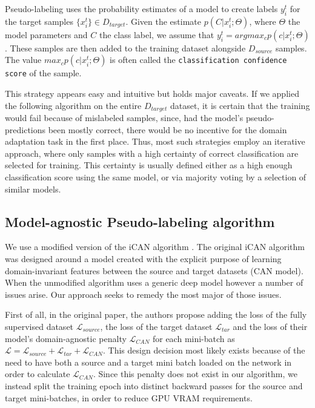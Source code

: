 \documentclass{article}
\newcommand{\loss}{\mathcal{L}}
\begin{document}
	Pseudo-labeling uses the probability estimates of a model to create labels $y_i^t$ for the target samples $\{x_i^t\} \in D_{target}$. Given the estimate $p(C | x_i^t; \Theta)$, where $\Theta$ the model parameters and $C$ the class label, we assume that $y_i^t = argmax_c{p(c | x_i^t; \Theta)}$. These samples are then added to the training dataset alongside $D_{source}$ samples. The value $max_c{p(c | x_i^t; \Theta)}$ is often called the \texttt{classification confidence score} of the sample. 
	
	This strategy appears easy and intuitive but holds major caveats. If we applied the following algorithm on the entire $D_{target}$ dataset, it is certain that the training would fail because of mislabeled samples, since, had the model's pseudo-predictions been mostly correct, there would be no incentive for the domain adaptation task in the first place. Thus, most such strategies employ an iterative approach, where only samples with a high certainty of correct classification are selected for training. This certainty is usually defined either as a high enough classification score using the same model, or via majority voting by a selection of similar models.
	
	
	\subsection{Model-agnostic Pseudo-labeling algorithm}
	\label{ssec:our-algorithm}
	
	We use a modified version of the iCAN algorithm \parencite{ican}. The original iCAN algorithm was designed around a model created with the explicit purpose of learning domain-invariant features between the source and target datasets (CAN model). When the unmodified algorithm uses a generic deep model however a number of issues arise. Our approach seeks to remedy the most major of those issues.
	
	First of all, in the original paper, the authors propose adding the loss of the fully supervised dataset $\loss_{source}$, the loss of the target dataset $\loss_{tar}$ and the loss of their model's domain-agnostic penalty $\loss_{CAN}$ for each mini-batch as $\loss = \loss_{source} + \loss_{tar} + \loss_{CAN}$. This design decision most likely exists because of the need to have both a source and a target mini batch loaded on the network in order to calculate $\loss_{CAN}$. Since this penalty does not exist in our algorithm, we instead split the training epoch into distinct backward passes for the source and target mini-batches, in order to reduce GPU VRAM requirements.
	
\end{document}

